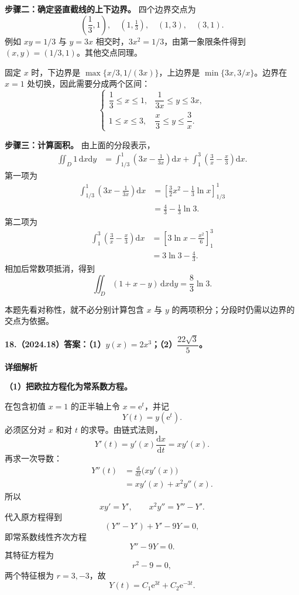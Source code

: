 \documentclass[UTF8,11pt,fontset=windows]{ctexart}
\begin{document}
\textbf{步骤二：确定竖直截线的上下边界。} 四个边界交点为
$$
\left(\frac13,1\right),\quad(1,\tfrac13),
\quad(1,3),\quad(3,1).
$$
例如 $xy=1/3$ 与 $y=3x$ 相交时，$3x^2=1/3$，由第一象限条件得到 $(x,y)=(1/3,1)$。其他交点同理。

固定 $x$ 时，下边界是 $\max\{x/3,1/(3x)\}$，上边界是 $\min\{3x,3/x\}$。边界在 $x=1$ 处切换，因此需要分成两个区间：
$$
\begin{cases}
\dfrac13\le x\le1,
&\dfrac1{3x}\le y\le3x,\\[5pt]
1\le x\le3,
&\dfrac x3\le y\le\dfrac3x.
\end{cases}
$$

\textbf{步骤三：计算面积。} 由上面的分段表示，
$$
\begin{aligned}
\iint_D1\,\mathrm dx\mathrm dy
&=\int_{1/3}^1\left(3x-\frac1{3x}\right)\mathrm dx
+\int_1^3\left(\frac3x-\frac x3\right)\mathrm dx.
\end{aligned}
$$
第一项为
$$
\begin{aligned}
\int_{1/3}^1\left(3x-\frac1{3x}\right)\mathrm dx
&=\left[\frac32x^2-\frac13\ln x\right]_{1/3}^1\\
&=\frac43-\frac13\ln3.
\end{aligned}
$$
第二项为
$$
\begin{aligned}
\int_1^3\left(\frac3x-\frac x3\right)\mathrm dx
&=\left[3\ln x-\frac{x^2}6\right]_1^3\\
&=3\ln3-\frac43.
\end{aligned}
$$
相加后常数项抵消，得到
$$
\boxed{\iint_D(1+x-y)\,\mathrm dx\mathrm dy
=\frac83\ln3}.
$$

本题先看对称性，就不必分别计算包含 $x$ 与 $y$ 的两项积分；分段时仍需以边界的交点为依据。

\clearpage

\textbf{18.（2024.18）答案：（1）$y(x)=2x^3$；（2）$\dfrac{22\sqrt3}{5}$。}

\textbf{详细解析}

\textbf{（1）把欧拉方程化为常系数方程。}

在包含初值 $x=1$ 的正半轴上令 $x=\mathrm e^t$，并记
$$
Y(t)=y(\mathrm e^t).
$$
必须区分对 $x$ 和对 $t$ 的求导。由链式法则，
$$
Y'(t)=y'(x)\frac{\mathrm dx}{\mathrm dt}=xy'(x).
$$
再求一次导数：
$$
\begin{aligned}
Y''(t)
&=\frac{\mathrm d}{\mathrm dt}\bigl(xy'(x)\bigr)\\
&=xy'(x)+x^2y''(x).
\end{aligned}
$$
所以
$$
xy'=Y',\qquad x^2y''=Y''-Y'.
$$
代入原方程得到
$$
(Y''-Y')+Y'-9Y=0,
$$
即常系数线性齐次方程
$$
Y''-9Y=0.
$$
其特征方程为
$$
r^2-9=0,
$$
两个特征根为 $r=3,-3$，故
$$
Y(t)=C_1\mathrm e^{3t}+C_2\mathrm e^{-3t}.
$$
\end{document}
